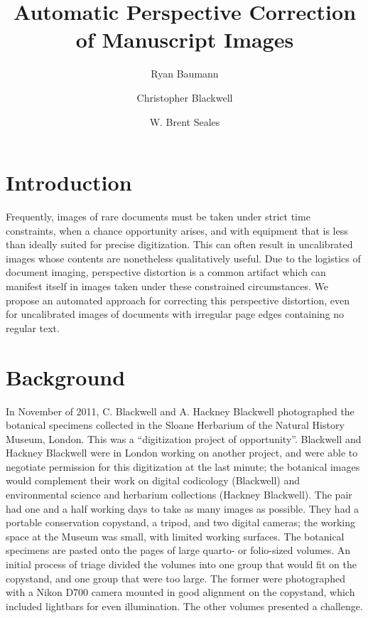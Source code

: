 \documentclass[runningheads,a4paper]{llncs}
\begin{document}
\mainmatter

\title{Automatic Perspective Correction of Manuscript Images}

\author{Ryan Baumann \and Christopher Blackwell \and W. Brent Seales}


\maketitle

\section{Introduction}

Frequently, images of rare documents must be taken under strict time constraints, 
when a chance opportunity arises, and with equipment that is less than ideally suited 
for precise digitization. This can often result in uncalibrated images
whose contents are nonetheless qualitatively useful. Due to the logistics of document
imaging, perspective distortion is a common artifact which can manifest itself in
images taken under these constrained circumstances. We propose an automated approach for
correcting this perspective distortion, even for uncalibrated images of documents
with irregular page edges containing no regular text.

\section{Background}

In November of 2011, C. Blackwell and A. Hackney Blackwell photographed the botanical specimens collected in the Sloane Herbarium of the Natural History Museum, London. This was a “digitization project of opportunity”. Blackwell and Hackney Blackwell were in London working on another project, and were able to negotiate permission for this digitization at the last minute; the botanical images would complement their work on digital codicology (Blackwell) and environmental science and herbarium collections (Hackney Blackwell). The pair had one and a half working days to take as many images as possible. They had a portable conservation copystand, a tripod, and two digital cameras; the working space at the Museum was small, with limited working surfaces. The botanical specimens are pasted onto the pages of large quarto- or folio-sized volumes. An initial process of triage divided the volumes into one group that would fit on the copystand, and one group that were too large. The former were photographed with a Nikon D700 camera mounted in good alignment on the copystand, which included lightbars for even illumination. The other volumes presented a challenge.
\end{document}
